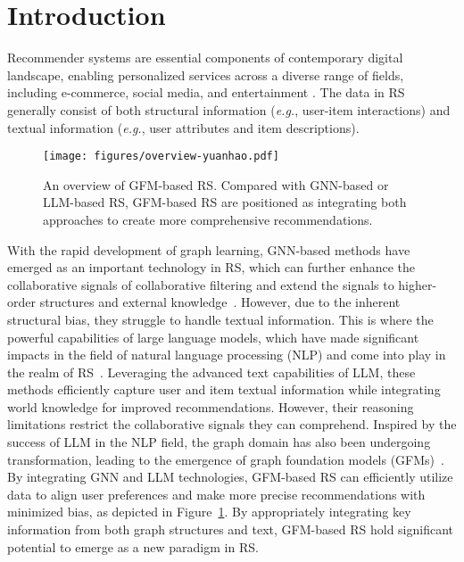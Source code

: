 \section{Introduction}
Recommender systems are essential components of contemporary digital landscape, enabling personalized services across a diverse range of fields, including e-commerce, social media, and entertainment \cite{zhang2023robust}. The data in RS generally consist of both structural information (\textit{e.g.}, user-item interactions) and textual information (\textit{e.g.}, user attributes and item descriptions).
\begin{figure}[ht]
    \centering
    \texttt{[image: figures/overview-yuanhao.pdf]}
    \caption{An overview of GFM-based RS. Compared with GNN-based or LLM-based RS, GFM-based RS are positioned as integrating both approaches to create more comprehensive recommendations.}
    \label{fig:overview}
\end{figure}
With the rapid development of graph learning, GNN-based methods have emerged as an important technology in RS, which can further enhance the collaborative signals of collaborative filtering and extend the signals to higher-order structures and external knowledge~\cite{wu2022graph}. However, due to the inherent structural bias, they struggle to handle textual information.
This is where the powerful capabilities of large language models, which have made significant impacts in the field of natural language processing (NLP) and come into play in the realm of RS~\cite{yang2023palr,zhai2024actions}. Leveraging the advanced text capabilities of LLM, these methods efficiently capture user and item textual information while integrating world knowledge for improved recommendations. However, their reasoning limitations restrict the collaborative signals they can comprehend.
Inspired by the success of LLM in the NLP field, the graph domain has also been undergoing transformation, leading to the emergence of graph foundation models (GFMs)~\cite{liu2023towards}. By integrating GNN and LLM technologies, GFM-based RS can efficiently utilize data to align user preferences and make more precise recommendations with minimized bias, as depicted in Figure~\ref{fig:overview}. By appropriately integrating key information from both graph structures and text, GFM-based RS hold significant potential to emerge as a new paradigm in RS.


